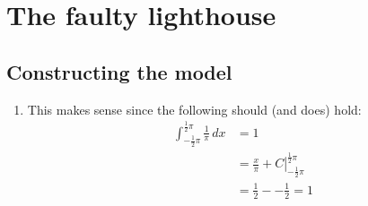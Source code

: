 \documentclass[paper=a4, fontsize=10pt]{scrartcl} %
\numberwithin{equation}{section} %
\numberwithin{figure}{section} %
\numberwithin{table}{section} %
\begin{document}
\section{The faulty lighthouse}
\subsection{Constructing the model}
\begin{enumerate}
	\item This makes sense since the following should (and does) hold:
			\begin{align}
				\int_{-\frac{1}{2}\pi}^{\frac{1}{2}\pi} \frac{1}{\pi} \, dx &= 1 \tag{To be proven}\\
				&= \left. \frac{x}{\pi} + C \right|_{-\frac{1}{2}\pi}^{\frac{1}{2}\pi}\\
				&= \frac{1}{2} - - \frac{1}{2} = 1
			\end{align}
\end{enumerate}
\end{document}
